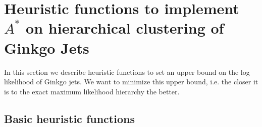 \documentclass[12pt]{article}
\newcommand{\bea}{\begin{eqnarray}\begin{aligned}}
\newcommand{\eea}{\end{aligned}\end{eqnarray}}
\begin{document}
%
%

\section{Heuristic functions to implement $A^*$ on hierarchical clustering of Ginkgo Jets}
In this section we describe heuristic functions to set an upper bound on the log likelihood of Ginkgo jets. We want to minimize this upper bound, i.e. the closer it is to the exact maximum likelihood hierarchy the better.

\subsection{Basic heuristic functions}





\end{document}
